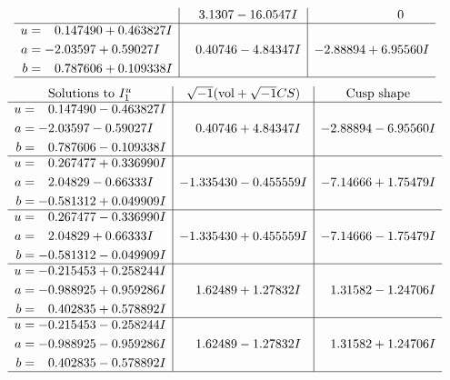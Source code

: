 \documentclass[1p]{elsarticle_modified}
\theoremstyle{definition}
\newcommand{\I}{\sqrt{-1}}
\begin{document}
$$\begin{array}{c|c|c}
 & \phantom{-}3.1307 - 16.0547 I & \phantom{-0.000000 } 0 \\ \hline\begin{aligned}
u &= \phantom{-}0.147490 + 0.463827 I \\
a &= -2.03597 + 0.59027 I \\
b &= \phantom{-}0.787606 + 0.109338 I\end{aligned}
 & \phantom{-}0.40746 - 4.84347 I & -2.88894 + 6.95560 I\\
 \hline 
 \end{array}$$\newpage$$\begin{array}{c|c|c}  
\text{Solutions to }I^u_{1}& \I (\text{vol} + \sqrt{-1}CS) & \text{Cusp shape}\\
 \hline 
\begin{aligned}
u &= \phantom{-}0.147490 - 0.463827 I \\
a &= -2.03597 - 0.59027 I \\
b &= \phantom{-}0.787606 - 0.109338 I\end{aligned}
 & \phantom{-}0.40746 + 4.84347 I & -2.88894 - 6.95560 I \\ \hline\begin{aligned}
u &= \phantom{-}0.267477 + 0.336990 I \\
a &= \phantom{-}2.04829 - 0.66333 I \\
b &= -0.581312 + 0.049909 I\end{aligned}
 & -1.335430 - 0.455559 I & -7.14666 + 1.75479 I \\ \hline\begin{aligned}
u &= \phantom{-}0.267477 - 0.336990 I \\
a &= \phantom{-}2.04829 + 0.66333 I \\
b &= -0.581312 - 0.049909 I\end{aligned}
 & -1.335430 + 0.455559 I & -7.14666 - 1.75479 I \\ \hline\begin{aligned}
u &= -0.215453 + 0.258244 I \\
a &= -0.988925 + 0.959286 I \\
b &= \phantom{-}0.402835 + 0.578892 I\end{aligned}
 & \phantom{-}1.62489 + 1.27832 I & \phantom{-}1.31582 - 1.24706 I \\ \hline\begin{aligned}
u &= -0.215453 - 0.258244 I \\
a &= -0.988925 - 0.959286 I \\
b &= \phantom{-}0.402835 - 0.578892 I\end{aligned}
 & \phantom{-}1.62489 - 1.27832 I & \phantom{-}1.31582 + 1.24706 I\\
 \hline 
 \end{array}$$\newpage\newpage\renewcommand{\arraystretch}{1}
\end{document}
